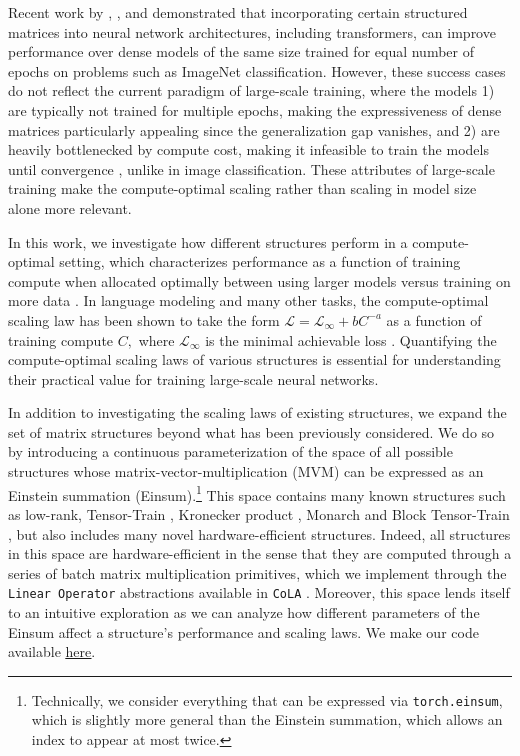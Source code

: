 \documentclass{article}
\renewcommand{\L}{\mathcal{L}}
\begin{document}
Recent work by \citet{dao2022monarch}, \citet{fu2023mixer}, and \citet{qiu2024compute} demonstrated that incorporating certain structured matrices into neural network architectures, including transformers, can improve performance over dense models of the same size trained for equal number of epochs on problems such as ImageNet classification.
However, these success cases do not reflect the current paradigm of large-scale training, where the models 1) are typically not trained for multiple epochs, making the expressiveness of dense matrices particularly appealing since the generalization gap vanishes, and 2) are heavily bottlenecked by compute cost, making it infeasible to train the models until convergence \citep{kaplan2020scaling, hoffmann2022training}, unlike in image classification. These attributes of large-scale training make the compute-optimal scaling rather than scaling in model size alone more relevant.

In this work, we investigate how different structures perform in a compute-optimal setting, which characterizes performance as a function of training compute when allocated optimally between using larger models versus training on more data \citep{kaplan2020scaling}.
In language modeling and many other tasks, the compute-optimal scaling law has been shown to take the form $\L  = \L_\infty + b C^{-a}$ as a function of training compute $C,$ where $\L_\infty$ is the minimal achievable loss \citep{kaplan2020scaling, hoffmann2022training, henighan2020scaling}. Quantifying the compute-optimal scaling laws of various structures is essential for understanding their practical value for training large-scale neural networks.

In addition to investigating the scaling laws of existing structures, we expand the set of matrix structures beyond what has been previously considered.
We do so by introducing a continuous parameterization of the space of all possible structures whose matrix-vector-multiplication (MVM) can be expressed as an Einstein summation (Einsum).\footnote{Technically, we consider everything that can be expressed via \texttt{torch.einsum}, which is slightly more general than the Einstein summation, which allows an index to appear at most twice.}
This space contains many known structures such as low-rank, Tensor-Train \citep{oseledets2011tt}, Kronecker product \citep{saatcci2012scalable, wilson2014fast, grosse2016kfac}, Monarch \citep{dao2022monarch} and Block Tensor-Train \citep{qiu2024compute}, but also includes many novel hardware-efficient structures.
Indeed, all structures in this space are hardware-efficient in the sense that they are computed through a series of batch matrix multiplication primitives, which we implement through the \texttt{Linear Operator} abstractions available in \texttt{CoLA} \citep{potapczynski2023cola}. Moreover, this space lends itself to an intuitive exploration as we can analyze how different parameters of the Einsum affect a structure's performance and scaling laws. We make our code available \href{https://github.com/AndPotap/einsum-search}{\underline{here}}.
\end{document}
